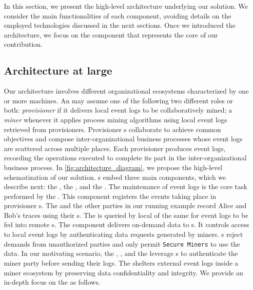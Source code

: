 
In this section, we present the high-level architecture underlying our solution. We consider the main functionalities of each component, avoiding details on the employed technologies discussed in the next sections. Once we introduced the architecture, we focus on the  component that represents the core of our contribution.

\subsection{Architecture at large}
Our architecture involves different organizational ecosystems characterized by one or more machines. An  may assume one of the following two different roles or both: \textit{provisioner} if it delivers local event logs to be collaboratively mined; a \textit{miner} whenever it applies process mining algorithms using local event logs retrieved from provisioners. Provisioner s collaborate to achieve common objectives and compose inter-organizational business processes whose event logs are scattered across multiple places. Each provisioner produces event logs, recording the operations executed to complete its part in the inter-organizational business process.  In \cref{fig:architecture_diagram}, we propose the high-level schematization of our solution. s embed three main components, which we describe next: the , the , and the . The maintenance of event logs is the core task performed by the . This component registers the events taking place in provisioner s.  The  and the other parties in our running example record Alice and Bob's traces using their s. The  is queried by local  of the same  for event logs to be fed into remote s. The  component delivers on-demand data to s. It controls access to local event logs by authenticating data requests generated by miners. s reject demands from unauthorized parties and only permit \texttt{Secure Miners} to use the data. In our motivating scenario, the , , and the  leverage s to authenticate the miner party before sending their logs. The  shelters external event logs inside a miner ecosystem by preserving data confidentiality and integrity.  We provide an in-depth focus on the  as follows.

